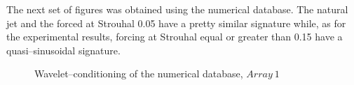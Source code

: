 \documentclass[english]{aiaa-tc}
\begin{document}
The next set of figures was obtained using the numerical database. The natural jet and the forced at Strouhal 0.05 have a pretty similar signature while, as for the experimental results, forcing at Strouhal equal or greater than 0.15 have a quasi--sinusoidal signature.

\begin{figure}[h!]
\begin{center}
\begin{centering}

\end{centering}
\caption{Wavelet--conditioning of the numerical database, $Array~1$}
\label{fig:numericalConditioning}
\end{center}
\end{figure}
\end{document}
